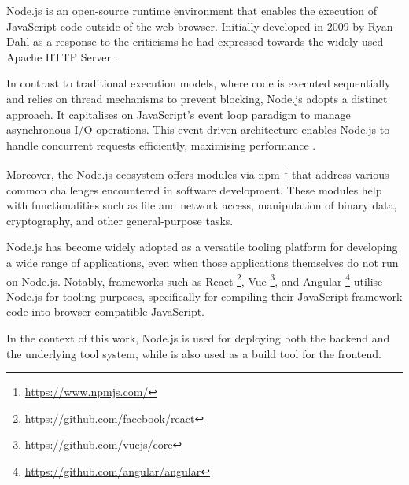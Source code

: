 Node.js is an open-source runtime environment that enables the execution of
JavaScript code outside of the web browser. Initially developed in 2009 by Ryan
Dahl as a response to the criticisms he had expressed towards the widely used
Apache HTTP Server .

In contrast to traditional execution models, where code is executed
sequentially and relies on thread mechanisms to prevent blocking, Node.js
adopts a distinct approach. It capitalises on JavaScript's event loop
 paradigm to manage asynchronous I/O operations.
This event-driven architecture enables Node.js to handle concurrent requests
efficiently, maximising performance .

Moreover, the Node.js ecosystem offers modules via npm
\footnote{\url{https://www.npmjs.com/}} that address various common challenges
encountered in software development. These modules help with functionalities
such as file and network access, manipulation of binary data, cryptography, and
other general-purpose tasks.

Node.js has become widely adopted as a versatile tooling platform for
developing a wide range of applications, even when those applications
themselves do not run on Node.js. Notably, frameworks such as React
\footnote{\url{https://github.com/facebook/react}}, Vue
\footnote{\url{https://github.com/vuejs/core}}, and Angular
\footnote{\url{https://github.com/angular/angular}} utilise Node.js for tooling
purposes, specifically for compiling their JavaScript framework code into
browser-compatible JavaScript.

In the context of this work, Node.js is used for deploying both the backend and
the underlying tool system, while is also used as a build tool for the
frontend.
